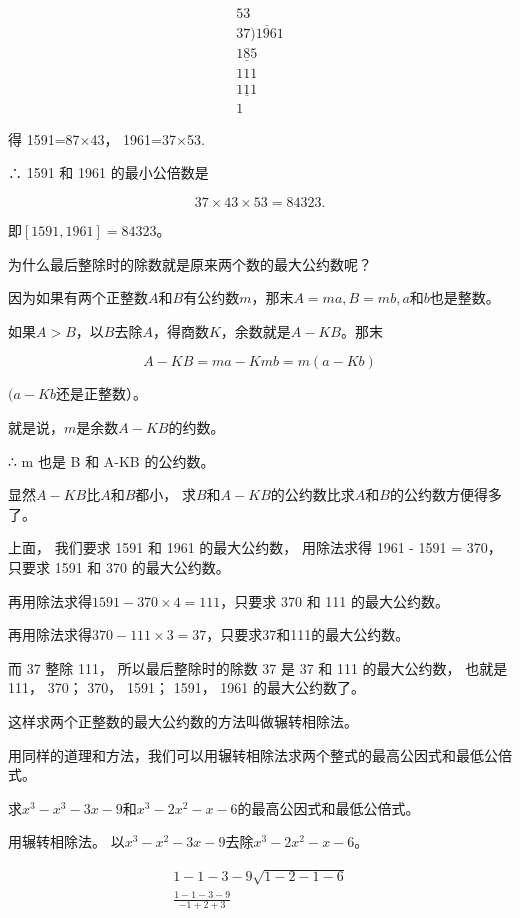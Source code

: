 \[
\begin{array}{r} 53 \\ 37 \overline {{) 1961}} \\ \underline {{185}} \\ 111 \\ \underline {{111}} \\ 1 \end{array}
\]

得 1591=87×43， 1961=37×53.

∴ 1591 和 1961 的最小公倍数是

\[
37 \times 43 \times 53 = 84323.
\]

即\([1591, 1961] = 84323\)。

为什么最后整除时的除数就是原来两个数的最大公约数呢？

因为如果有两个正整数\(A\)和\(B\)有公约数\(m\)，那末\(A = ma, B = mb, a\)和\(b\)也是整数。

如果\(A > B\)，以\(B\)去除\(A\)，得商数\(K\)，余数就是\(A - KB\)。那末

\[
A - K B = m a - K m b = m (a - K b)
\]

\((a - Kb\)还是正整数）。

就是说，\(m\)是余数\(A - KB\)的约数。

∴ m 也是 B 和 A-KB 的公约数。

显然\(A - KB\)比\(A\)和\(B\)都小，
求\(B\)和\(A - KB\)的公约数比求\(A\)和\(B\)的公约数方便得多了。

上面， 我们要求 1591 和 1961 的最大公约数， 用除法求得 1961 - 1591 =
370， 只要求 1591 和 370 的最大公约数。

再用除法求得\(1591 - 370 \times 4 = 111\)，只要求 370 和 111
的最大公约数。

再用除法求得\(370 - 111 \times 3 = 37\)，只要求37和111的最大公约数。

而 37 整除 111， 所以最后整除时的除数 37 是 37 和 111 的最大公约数，
也就是 111， 370； 370， 1591； 1591， 1961 的最大公约数了。

这样求两个正整数的最大公约数的方法叫做辗转相除法。

用同样的道理和方法，我们可以用辗转相除法求两个整式的最高公因式和最低公倍式。

求\(x^{3}-x^{3}-3x-9\)和\(x^{3}-2x^{2}-x-6\)的最高公因式和最低公倍式。

 用辗转相除法。
以\(x^{3} - x^{2} - 3x - 9\)去除\(x^{3} - 2x^{2} - x - 6\)。

\[
\begin{array}{l} 1 - 1 - 3 - 9 \sqrt {1 - 2 - 1 - 6} \\ \frac{1 - 1 - 3 - 9}{- 1 + 2 + 3} \\ \end{array}
\]

